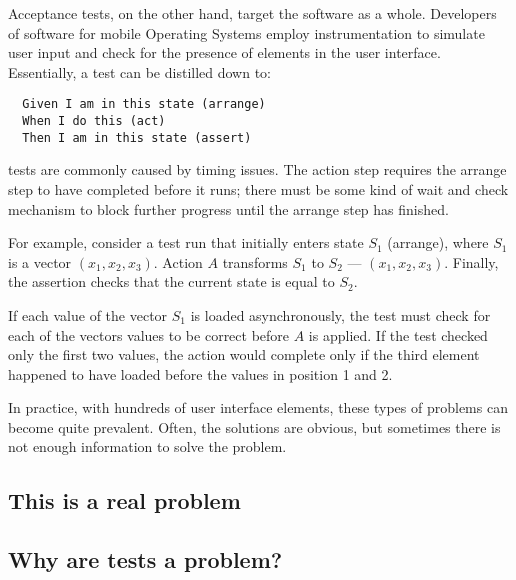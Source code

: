 Acceptance tests, on the other hand, target the software as a whole. Developers of software for mobile Operating Systems employ instrumentation to simulate user input and check for the presence of elements in the user interface. Essentially, a test can be distilled down to:
\begin{verbatim}
  Given I am in this state (arrange)
  When I do this (act)
  Then I am in this state (assert)
\end{verbatim}

\flaky{} tests are commonly caused by timing issues. The action step requires the arrange step to have completed before it runs; there must be some kind of wait and check mechanism to block further progress until the arrange step has finished.

For example, consider a test run that initially enters state $S_{1}$ (arrange), where $S_{1}$ is a vector $(x_{1},x_{2},x_{3})$. Action $A$ transforms $S_1$ to $S_2$ --- $(x_{1},x_{2},x_{3})$. Finally, the assertion checks that the current state is equal to $S_2$.

If each value of the vector $S_{1}$ is loaded asynchronously, the test must check for each of the vectors values to be correct before $A$ is applied. If the test checked only the first two values, the action would complete only if the third element happened to have loaded before the values in position 1 and 2.

In practice, with hundreds of user interface elements, these types of problems can become quite prevalent. Often, the solutions are obvious, but sometimes there is not enough information to solve the problem.


\subsection{This is a real problem}



\subsection{Why are \flaky{} tests a problem?}


